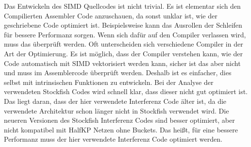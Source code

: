 Das Entwickeln des \ac{SIMD} Quellcodes ist nicht trivial. Es ist elementar sich den Compilierten Assembler Code anzuschauen, da sonst unklar ist, wie der geschriebene Code optimiert ist. Beispielsweise kann das Ausrollen der Schleifen für bessere Performanz sorgen. Wenn sich dafür auf den Compiler verlassen wird, muss das überprüft werden. Oft unterscheiden sich verschiedene Compiler in der Art der Optimierung. Es ist möglich, dass der Compiler verstehen kann, wie der Code automatisch mit \ac{SIMD} vektorisiert werden kann, sicher ist das aber nicht und muss im Assemblercode überprüft werden. Deshalb ist es einfacher, dies selbst mit intrinsischen Funktionen zu entwickeln. Bei der Analyse der verwendeten Stockfish Codes wird schnell klar, dass dieser nicht gut optimiert ist. Das liegt daran, dass der hier verwendete Interferenz Code älter ist, da die verwendete Architektur schon länger nicht in Stockfish verwendet wird. Die neueren Versionen des Stockfish Interferenz Codes sind besser optimiert, aber nicht kompatibel mit HalfKP Netzen ohne Buckets. Das heißt, für eine bessere Performanz muss der hier verwendete Interferenz Code optimiert werden.